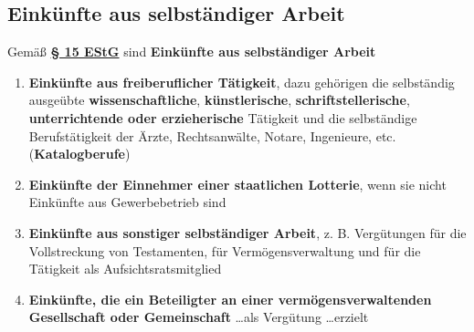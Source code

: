 \documentclass[12pt,A4]{extarticle}
\newcommand{\highlight}[1]{\textcolor{highlightColor}{\textbf{#1}}}
\newcommand{\estG}[2][]{\textbf{\textcolor{gesetzLink}{\href{https://www.gesetze-im-internet.de/estg/__#2.html}{§ #2 \ifthenelse{\equal{#1}{}}{}{#1 }EStG}}}}
\begin{document}
\subsection{Einkünfte aus selbständiger Arbeit}
Gemäß \estG[Abs. 1]{15} sind \highlight{Einkünfte aus selbständiger Arbeit}
\begin{enumerate}
  \item{\textbf{Einkünfte aus freiberuflicher Tätigkeit}, dazu gehörigen die selbständig ausgeübte \textbf{wissenschaftliche}, \textbf{künstlerische}, \textbf{schriftstellerische}, \textbf{unterrichtende oder erzieherische} Tätigkeit und die selbständige Berufstätigkeit der Ärzte, Rechtsanwälte, Notare, Ingenieure, etc. (\highlight{Katalogberufe})}
  \item{\textbf{Einkünfte der Einnehmer einer staatlichen Lotterie}, wenn sie nicht Einkünfte aus Gewerbebetrieb sind}
  \item{\textbf{Einkünfte aus sonstiger selbständiger Arbeit}, z. B. Vergütungen für die Vollstreckung von Testamenten, für Vermögensverwaltung und für die Tätigkeit als Aufsichtsratsmitglied}
  \item{\textbf{Einkünfte, die ein Beteiligter an einer vermögensverwaltenden Gesellschaft oder Gemeinschaft} \dots als Vergütung \dots erzielt}
\end{enumerate}
\end{document}
